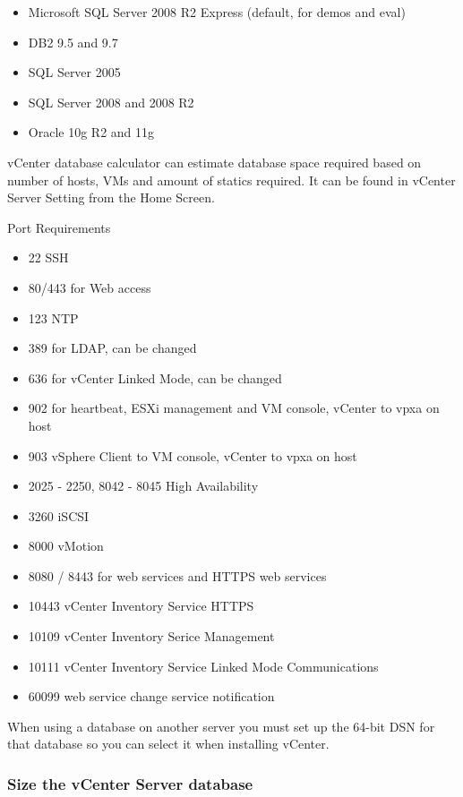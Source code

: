 \begin{itemize}
\item Microsoft SQL Server 2008 R2 Express (default, for demos and eval)
\item DB2 9.5 and 9.7
\item SQL Server 2005
\item SQL Server 2008 and 2008 R2
\item Oracle 10g R2 and 11g
\end{itemize}

vCenter database calculator can estimate database space required based on
number of hosts, VMs and amount of statics required. It can be found in vCenter
Server Setting from the Home Screen.

Port Requirements

\begin{itemize}
\item 22 SSH
\item 80/443 for Web access
\item 123 NTP
\item 389 for LDAP, can be changed
\item 636 for vCenter Linked Mode, can be changed
\item 902 for heartbeat, ESXi management and VM console, vCenter to vpxa on host
\item 903 vSphere Client to VM console, vCenter to vpxa on host
\item 2025 - 2250, 8042 - 8045 High Availability
\item 3260 iSCSI
\item 8000 vMotion
\item 8080 / 8443 for web services and HTTPS web services
\item 10443 vCenter Inventory Service HTTPS
\item 10109 vCenter Inventory Serice Management
\item 10111 vCenter Inventory Service Linked Mode Communications
\item 60099 web service change service notification
\end{itemize}

When using a database on another server you must set up the 64-bit DSN for that database so you
can select it when installing vCenter.

\subsubsection{Size the vCenter Server database}


